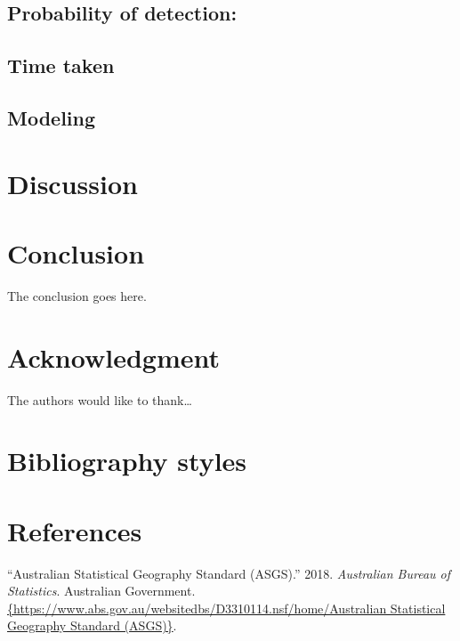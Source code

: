 \documentclass[conference,final,]{IEEEtran}
\begin{document}
\hypertarget{probability-of-detection}{%
\subsection{Probability of detection:}\label{probability-of-detection}}

\hypertarget{time-taken}{%
\subsection{Time taken}\label{time-taken}}

\hypertarget{modeling-1}{%
\subsection{Modeling}\label{modeling-1}}

\hypertarget{discussion}{%
\section{Discussion}\label{discussion}}

\hypertarget{conclusion}{%
\section{Conclusion}\label{conclusion}}

The conclusion goes here.

\hypertarget{acknowledgment}{%
\section{Acknowledgment}\label{acknowledgment}}

The authors would like to thank\ldots{}

\hypertarget{bibliography-styles}{%
\section{Bibliography styles}\label{bibliography-styles}}

\newpage

\hypertarget{references}{%
\section{References}\label{references}}

\hypertarget{refs}{}
\leavevmode\hypertarget{ref-abs2016}{}%
``Australian Statistical Geography Standard (ASGS).'' 2018.
\emph{Australian Bureau of Statistics}. Australian Government.
\href{\%7Bhttps://www.abs.gov.au/websitedbs/D3310114.nsf/home/Australian\%20\%20\%20Statistical\%20Geography\%20Standard\%20(ASGS)\%7D}{\{https://www.abs.gov.au/websitedbs/D3310114.nsf/home/Australian   Statistical Geography Standard (ASGS)\}}.
\end{document}

